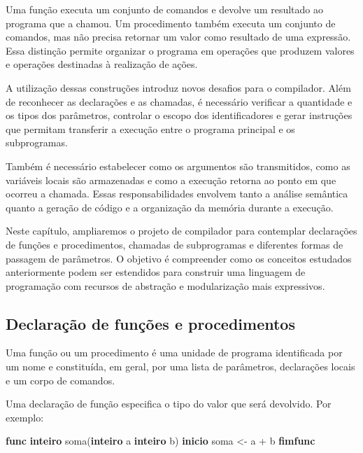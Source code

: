 \documentclass[
  brazilian,
  letterpaper,
]{book}
\newenvironment{Shaded}{\begin{snugshade}}{\end{snugshade}}
\newcommand{\KeywordTok}[1]{\textcolor[rgb]{0.00,0.23,0.31}{\textbf{#1}}}
\newcommand{\NormalTok}[1]{\textcolor[rgb]{0.00,0.23,0.31}{#1}}
\theoremstyle{plain}
\theoremstyle{definition}
\theoremstyle{remark}
\begin{document}
Uma função executa um conjunto de comandos e devolve um resultado ao
programa que a chamou. Um procedimento também executa um conjunto de
comandos, mas não precisa retornar um valor como resultado de uma
expressão. Essa distinção permite organizar o programa em operações que
produzem valores e operações destinadas à realização de ações.

A utilização dessas construções introduz novos desafios para o
compilador. Além de reconhecer as declarações e as chamadas, é
necessário verificar a quantidade e os tipos dos parâmetros, controlar o
escopo dos identificadores e gerar instruções que permitam transferir a
execução entre o programa principal e os subprogramas.

Também é necessário estabelecer como os argumentos são transmitidos,
como as variáveis locais são armazenadas e como a execução retorna ao
ponto em que ocorreu a chamada. Essas responsabilidades envolvem tanto a
análise semântica quanto a geração de código e a organização da memória
durante a execução.

Neste capítulo, ampliaremos o projeto de compilador para contemplar
declarações de funções e procedimentos, chamadas de subprogramas e
diferentes formas de passagem de parâmetros. O objetivo é compreender
como os conceitos estudados anteriormente podem ser estendidos para
construir uma linguagem de programação com recursos de abstração e
modularização mais expressivos.

\subsection{Declaração de funções e
procedimentos}\label{declarauxe7uxe3o-de-funuxe7uxf5es-e-procedimentos}

Uma função ou um procedimento é uma unidade de programa identificada por
um nome e constituída, em geral, por uma lista de parâmetros,
declarações locais e um corpo de comandos.

Uma declaração de função especifica o tipo do valor que será devolvido.
Por exemplo:

\begin{Shaded}
\begin{Highlighting}[]
\KeywordTok{func} \KeywordTok{inteiro}\NormalTok{ soma(}\KeywordTok{inteiro}\NormalTok{ a }\KeywordTok{inteiro}\NormalTok{ b)}
\KeywordTok{inicio}
\NormalTok{    soma \textless{}{-} a + b}
\KeywordTok{fimfunc}
\end{Highlighting}
\end{Shaded}
\end{document}
